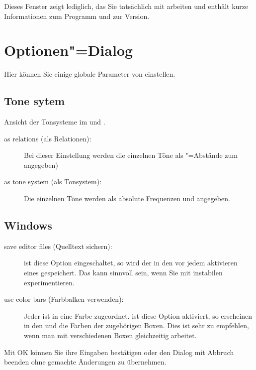 Dieses Fenster zeigt lediglich, das Sie tatsächlich mit \mutabor{} 
arbeiten und enthält kurze Informationen zum Programm und zur 
Version.

\section{Optionen"=Dialog}\label{sec:DE_SETUP}
Hier können Sie einige globale Parameter von \mutabor{} einstellen.


\subsection{Tone sytem}
Ansicht der Tonsysteme im
 und
.
\begin{description}
\item[as relations (als Relationen):] Bei dieser Einstellung werden
  die einzelnen Töne als "=Abstände zum
   angegeben)
\item[as tone system (als Tonsystem):] Die einzelnen Töne werden als
  absolute Frequenzen und 
  angegeben.
\end{description}

\subsection{Windows}
\begin{description}
\item[save editor files (Quelltext sichern):] ist diese Option
  eingeschaltet, so wird der  in
  den  vor jedem aktivieren eines
   gespeichert.  Das
  kann sinnvoll sein, wenn Sie mit instabilen
   experimentieren.
\item[use color bars (Farbbalken verwenden):] Jeder
   ist in \mutabor{} eine Farbe zugeordnet.
  ist diese Option aktiviert, so erscheinen in den
   und
   die Farben der
  zugehörigen Boxen. Dies ist sehr zu empfehlen, wenn man mit
  verschiedenen Boxen gleichzeitig arbeitet.
\end{description}

Mit OK können Sie ihre Eingaben bestätigen oder den Dialog 
mit Abbruch beenden ohne gemachte Änderungen zu übernehmen.






